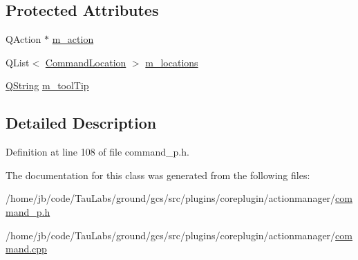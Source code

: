 \subsection*{\-Protected \-Attributes}
\begin{DoxyCompactItemize}
\item 
\-Q\-Action $\ast$ \hyperlink{group___core_plugin_ga827e65b079e2f8aee3efde2303268033}{m\-\_\-action}
\item 
\-Q\-List$<$ \hyperlink{struct_command_location}{\-Command\-Location} $>$ \hyperlink{group___core_plugin_ga7eefc17da6c9cd4cfb8cd25d9e4f36f3}{m\-\_\-locations}
\item 
\hyperlink{group___u_a_v_objects_plugin_gab9d252f49c333c94a72f97ce3105a32d}{\-Q\-String} \hyperlink{group___core_plugin_gaf4ee67cdbac6ade0ff69cde9b002fd28}{m\-\_\-tool\-Tip}
\end{DoxyCompactItemize}


\subsection{\-Detailed \-Description}


\-Definition at line 108 of file command\-\_\-p.\-h.



\-The documentation for this class was generated from the following files\-:\begin{DoxyCompactItemize}
\item 
/home/jb/code/\-Tau\-Labs/ground/gcs/src/plugins/coreplugin/actionmanager/\hyperlink{command__p_8h}{command\-\_\-p.\-h}\item 
/home/jb/code/\-Tau\-Labs/ground/gcs/src/plugins/coreplugin/actionmanager/\hyperlink{command_8cpp}{command.\-cpp}\end{DoxyCompactItemize}

